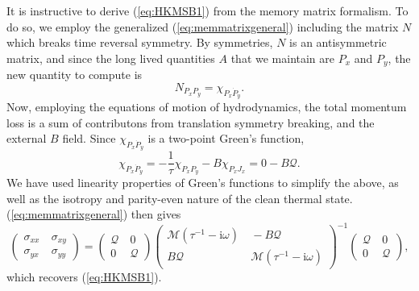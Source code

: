 \documentclass[10pt, oneside]{book}
\begin{document}
\begin{doublespace}
It is instructive to derive (\ref{eq:HKMSB1}) from the memory matrix formalism.   To do so, we employ the generalized (\ref{eq:memmatrixgeneral}) including the matrix $N$ which breaks time reversal symmetry.  By symmetries, $N$ is an antisymmetric matrix, and since the long lived quantities $A$ that we maintain are $P_x$ and $P_y$, the new quantity to compute is \begin{equation}
N_{P_xP_y} = \chi_{P_x \dot{P}_y}.
\end{equation}
Now, employing the equations of motion of hydrodynamics, the total momentum loss is a sum of contributons from translation symmetry breaking, and the external $B$ field.   Since $\chi_{P_x\dot{P}_y}$ is a two-point Green's function, \begin{equation}
\chi_{P_x\dot{P}_y} = -\frac{1}{\tau} \chi_{P_xP_y} - B\chi_{P_x J_x}  = 0-B\mathcal{Q}.  \label{eq:Nexample}
\end{equation}
We have used linearity properties of Green's functions to simplify the above, as well as the isotropy and parity-even nature of the clean thermal state.    (\ref{eq:memmatrixgeneral}) then gives \begin{equation}
\left(\begin{array}{cc} \sigma_{xx} &\ \sigma_{xy} \\ \sigma_{yx} &\ \sigma_{yy} \end{array}\right) = \left(\begin{array}{cc} \mathcal{Q} &\ 0 \\ 0 &\ \mathcal{Q} \end{array}\right)   \left(\begin{array}{cc} \mathcal{M}(\tau^{-1}-\mathrm{i}\omega) &\ -B\mathcal{Q} \\ B\mathcal{Q} &\ \mathcal{M}(\tau^{-1}-\mathrm{i}\omega) \end{array}\right)^{-1} \left(\begin{array}{cc} \mathcal{Q} &\ 0 \\ 0 &\ \mathcal{Q} \end{array}\right),
\end{equation}
which recovers (\ref{eq:HKMSB1}).   


\end{doublespace}
\end{document}
